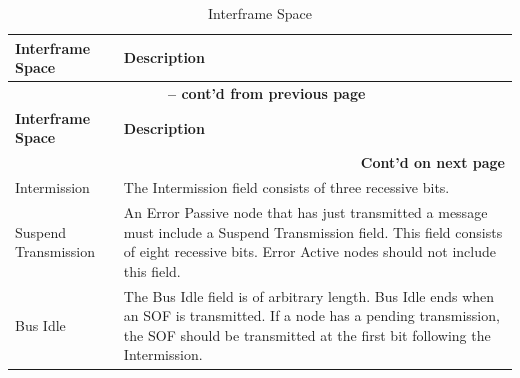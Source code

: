 \begin{longtable}[c]{|p{4cm}|p{11cm}|} 
  \caption{Interframe Space}
  \label{tab:twai-interframe-space} 
  \\\hline
  \rowcolor{lightgray}
  \textbf{Interframe Space} & \textbf{Description}
  \\\hline
  \endfirsthead
  
  \multicolumn{2}{c}{\bfseries \tablename\ \thetable{} -- cont'd from previous page}\\  \hline
  
  \rowcolor{lightgray}
    \textbf{Interframe Space} & \textbf{Description}
  \\\hline
  \endhead
  
  \multicolumn{2}{r}{\textbf{Cont'd on next page}} \\
  \endfoot
  \endlastfoot

    Intermission & The Intermission field consists of three recessive bits.
           \\\hline
    Suspend Transmission & An Error Passive node that has just transmitted a message must include a Suspend Transmission field. This field consists of eight recessive bits. Error Active nodes should not include this field.
            \\\hline
    Bus Idle & The Bus Idle field is of arbitrary length. Bus Idle ends when an SOF is transmitted. If a node has a pending transmission, the SOF should be transmitted at the first bit following the Intermission.         
            \\\hline
    
\end{longtable}
